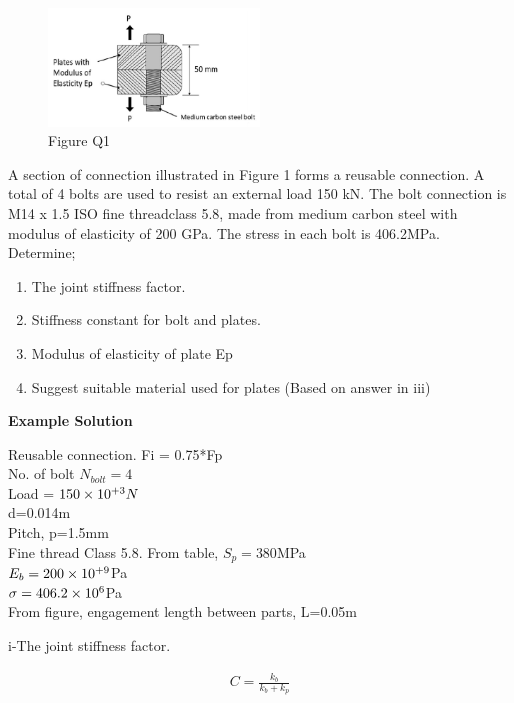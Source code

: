 \documentclass[a4paper, fleqn]{article}
\providecommand{\sci}[1]{\protect\ensuremath{\times 10^{\StrSubstitute[0]{#1}{e}{}}}}
\begin{document}
\begin{figure}[h]
    \centering
    \includegraphics[width=0.5\textwidth]{t31-q1.png}
    \caption{Figure Q1}
\end{figure}

A section of connection illustrated in Figure 1 forms a reusable connection. A total of 4 bolts are used to resist an external load 150 kN. The bolt connection is M14 x 1.5 ISO fine threadclass 5.8, made from medium carbon steel with modulus of elasticity of 200 GPa. The stress in each bolt is 406.2MPa. Determine;

\begin{enumerate}[label=(\roman*)]
    \item The joint stiffness factor.
    \item Stiffness constant for bolt and plates.
    \item Modulus of elasticity of plate Ep
    \item Suggest suitable material used for plates (Based on answer in iii)
\end{enumerate}

\vspace{10pt}
\textbf{Example Solution}
\vspace{10pt}

Reusable connection. Fi = 0.75*Fp\\
No. of bolt $N_{bolt}=4$\\
Load = $150\sci{e+3}N$\\
d=0.014m\\
Pitch, p=1.5mm\\
Fine thread Class 5.8. From table, $S_p=380$MPa\\
$E_b=200\sci{e+9}$Pa\\
$\sigma = 406.2\sci{e6}$Pa\\
From figure, engagement length between parts, L=0.05m
\vspace{10pt}

i-The joint stiffness factor.

\begin{equation} \label{eqjointstiffness}
    \begin{aligned}
    C=\frac{k_b}{k_b+k_p}\\
    \end{aligned}
\end{equation}
\end{document}
